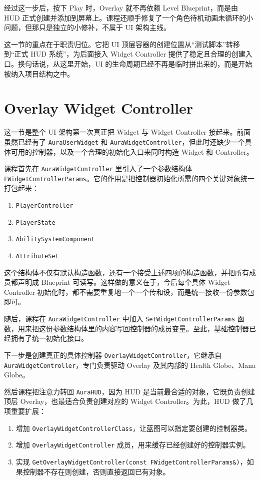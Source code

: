 经过这一步后，按下 Play 时，Overlay 就不再依赖 Level Blueprint，而是由 HUD 正式创建并添加到屏幕上。课程还顺手修复了一个角色待机动画未循环的小问题，但那只是独立的小修补，不属于 UI 架构主线。

这一节的重点在于职责归位。它把 UI 顶层容器的创建位置从“测试脚本”转移到“正式 HUD 系统”，为后面接入 Widget Controller 提供了稳定且合理的创建入口。换句话说，从这里开始，UI 的生命周期已经不再是临时拼出来的，而是开始被纳入项目结构之中。

\section{Overlay Widget Controller}

这一节是整个 UI 架构第一次真正把 Widget 与 Widget Controller 接起来。前面虽然已经有了 \texttt{AuraUserWidget} 和 \texttt{AuraWidgetController}，但此时还缺少一个具体可用的控制器，以及一个合理的初始化入口来同时构造 Widget 和 Controller。

课程首先在 \texttt{AuraWidgetController} 里引入了一个参数结构体 \texttt{FWidgetControllerParams}。它的作用是把控制器初始化所需的四个关键对象统一打包起来：
\begin{enumerate}
	\item \texttt{PlayerController}
	\item \texttt{PlayerState}
	\item \texttt{AbilitySystemComponent}
	\item \texttt{AttributeSet}
\end{enumerate}

这个结构体不仅有默认构造函数，还有一个接受上述四项的构造函数，并把所有成员都声明成 Blueprint 可读写。这样做的意义在于，今后每个具体 Widget Controller 初始化时，都不需要重复地一个一个传和设，而是统一接收一份参数包即可。

随后，课程在 \texttt{AuraWidgetController} 中加入 \texttt{SetWidgetControllerParams} 函数，用来把这份参数结构体里的内容写回控制器的成员变量。至此，基础控制器已经拥有了统一初始化接口。

下一步是创建真正的具体控制器 \texttt{OverlayWidgetController}，它继承自 \texttt{AuraWidgetController}，专门负责驱动 Overlay 及其内部的 Health Globe、Mana Globe。

然后课程把注意力转回 \texttt{AuraHUD}，因为 HUD 是当前最合适的对象，它既负责创建顶层 Overlay，也最适合负责创建对应的 Widget Controller。为此，HUD 做了几项重要扩展：
\begin{enumerate}
	\item 增加 \texttt{OverlayWidgetControllerClass}，让蓝图可以指定要创建的控制器类。
	\item 增加 \texttt{OverlayWidgetController} 成员，用来缓存已经创建好的控制器实例。
	\item 实现 \texttt{GetOverlayWidgetController(const FWidgetControllerParams\&)}，如果控制器不存在则创建，否则直接返回已有对象。
\end{enumerate}

